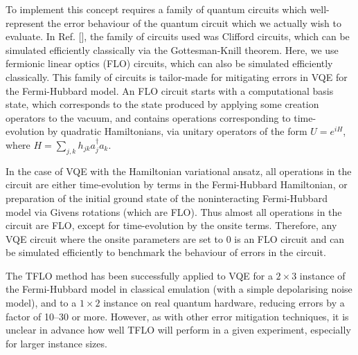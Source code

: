\documentclass[aps,prb,twoside,superscriptaddress,longbibliography,nofootinbib,floatfix, notitlepage,twocolumn]{revtex4-1}
\begin{document}
{To implement this concept requires a family of quantum circuits which well-represent the error behaviour of the quantum circuit which we actually wish to evaluate. In Ref. [], the family of circuits used was Clifford circuits, which can be simulated efficiently classically via the Gottesman-Knill theorem. Here, we use fermionic linear optics (FLO) circuits, which can also be simulated efficiently classically\cite{terhal02}. This family of circuits is tailor-made for mitigating errors in VQE for the Fermi-Hubbard model. An FLO circuit starts with a computational basis state, which corresponds to the state produced by applying some creation operators to the vacuum, and contains operations corresponding to time-evolution by quadratic Hamiltonians, via unitary operators of the form $U = e^{iH}$, where $H = \sum_{j,k} h_{jk} a_j^\dag a_k$.

In the case of VQE with the Hamiltonian variational ansatz\cite{wecker15}, all operations in the circuit are either time-evolution by terms in the Fermi-Hubbard Hamiltonian, or preparation of the initial ground state of the noninteracting Fermi-Hubbard model via Givens rotations (which are FLO). Thus almost all operations in the circuit are FLO, except for time-evolution by the onsite terms. Therefore, any VQE circuit where the onsite parameters are set to 0 is an FLO circuit and can be simulated efficiently to benchmark the behaviour of errors in the circuit.

The TFLO method has been successfully applied to VQE for a $2\times 3$ instance of the Fermi-Hubbard model in classical emulation (with a simple depolarising noise model), and to a $1\times 2$ instance on real quantum hardware\cite{montanaro21}, reducing errors by a factor of 10--30 or more. However, as with other error mitigation techniques, it is unclear in advance how well TFLO will perform in a given experiment, especially for larger instance sizes.

}
\end{document}

